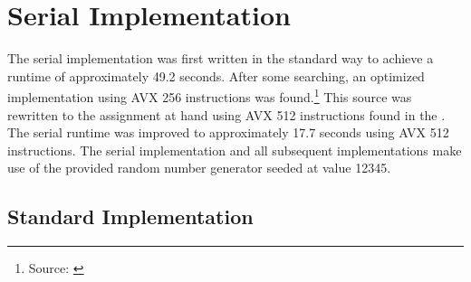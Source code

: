 \documentclass{article}
\newcommand{\MYhref}[3][blue]{\href{#2}{\color{#1}{#3}}}%
\begin{document}
\section{Serial Implementation}
The serial implementation was first written in the standard way to achieve a runtime of approximately 
49.2 seconds. After some searching, an optimized implementation using AVX 256 instructions was found.\footnote{Source: \MYhref{https://polarnick.com/blogs/other/cpu/gpu/sse/opencl/openmp/2016/10/01/mandelbrot-set-sse-opencl.html}{https://polarnick.com/blogs/other/cpu/gpu/sse/opencl/openmp/2016/10/01/mandelbrot-set-sse-opencl.html}} 
This source was rewritten to the assignment at hand using AVX 512 instructions found in the \MYhref{https://www.intel.com/content/www/us/en/docs/intrinsics-guide/index.html}{intel intrinsics guide}. 
The serial runtime was improved to approximately 17.7 seconds using AVX 512 instructions. 
The serial implementation and all subsequent implementations make use of the provided 
random number generator seeded at value 12345.

\subsection{Standard Implementation}
\end{document}
